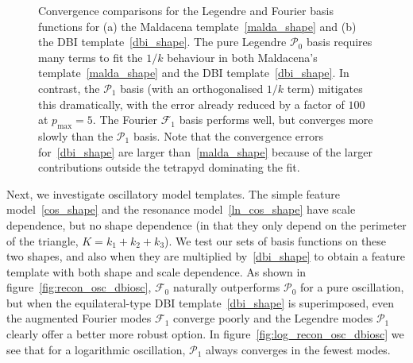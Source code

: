 \documentclass[a4paper,12pt]{extarticle}
\newcommand{\Pmax}{p_\text{max}}
\newcommand{\Lbasic}{\mathcal{P}_0}
\newcommand{\Linvk}{\mathcal{P}_1}
\newcommand{\Fbasic}{\mathcal{F}_0}
\newcommand{\Finvk}{\mathcal{F}_1}
\begin{document}
\begin{figure}[!pth]
\centering     %
{}
\caption{
    Convergence comparisons for the Legendre and Fourier basis functions for (a) the Maldacena 
    template~\eqref{malda_shape} and (b) the DBI template~\eqref{dbi_shape}.
    The pure Legendre $\Lbasic$ basis requires many terms to fit the $1/k$ behaviour
    in both Maldacena's template~\eqref{malda_shape} and the DBI template~\eqref{dbi_shape}.
    In contrast, the $\Linvk$ basis (with an orthogonalised $1/k$ term) mitigates this dramatically, with the 
    error already reduced by a factor of $100$ at $\Pmax=5$.
    The Fourier $\Finvk$ basis performs well, but converges more slowly than the $\Linvk$ basis.
    Note that the convergence errors for~\eqref{dbi_shape} are larger than~\eqref{malda_shape} because of the larger contributions outside the tetrapyd dominating the fit.
}\label{fig:recon_malda_dbi}
\end{figure}


Next, we investigate oscillatory model templates.
The simple feature model~\eqref{cos_shape} and the resonance model~\eqref{ln_cos_shape}
have scale dependence, but no shape dependence (in that they only depend on the perimeter
of the triangle, $K=k_1+k_2+k_3$).
We test our sets of basis functions on these two shapes,
and also when they are multiplied by~\eqref{dbi_shape} to obtain a feature
template with both shape and scale dependence.
As shown in figure~\ref{fig:recon_osc_dbiosc},
$\Fbasic$ naturally outperforms $\Lbasic$ for a pure oscillation,
but when the equilateral-type DBI template~\eqref{dbi_shape} is superimposed, even the augmented Fourier modes
$\Finvk$ converge poorly and the Legendre modes $\Linvk$ clearly offer a better more robust option.
In figure~\ref{fig:log_recon_osc_dbiosc} we see that for a logarithmic
oscillation, $\Linvk$ always converges in the fewest modes.
\end{document}
